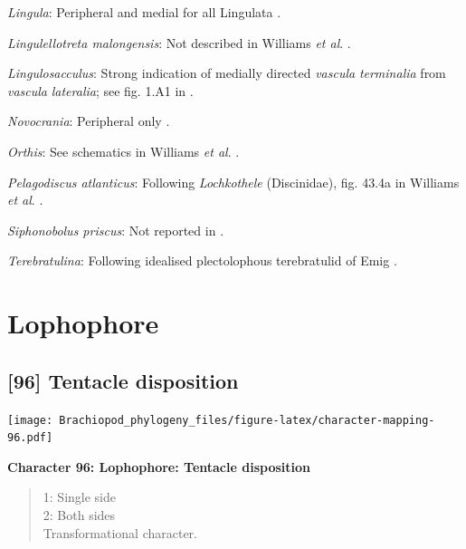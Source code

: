 \documentclass[openany]{book}
\theoremstyle{definition}
\theoremstyle{definition}
\theoremstyle{definition}
\theoremstyle{remark}
\begin{document}
\hypertarget{Lingula-coding-95}{}
\emph{Lingula}: Peripheral and medial for all Lingulata
\citep{Williams2000LinguliformeaCraniiformea}.

\hypertarget{Lingulellotreta_malongensis-coding-95}{}
\emph{Lingulellotreta malongensis}: Not described in Williams \emph{et
al}. \citeyearpar{Williams2000LinguliformeaCraniiformea}.

\hypertarget{Lingulosacculus-coding-95}{}
\emph{Lingulosacculus}: Strong indication of medially directed
\emph{vascula} \emph{terminalia} from \emph{vascula} \emph{lateralia};
see fig. 1.A1 in \citet{Balthasar2009EarlyCambrian}.

\hypertarget{Novocrania-coding-95}{}
\emph{Novocrania}: Peripheral only
\citep[p.158]{Williams2000LinguliformeaCraniiformea}.

\hypertarget{Orthis-coding-95}{}
\emph{Orthis}: See schematics in Williams \emph{et al}.
\citeyearpar{Williams2000LinguliformeaCraniiformea}.

\hypertarget{Pelagodiscus_atlanticus-coding-95}{}
\emph{Pelagodiscus atlanticus}: Following \emph{Lochkothele}
(Discinidae), fig. 43.4a in Williams \emph{et al}.
\citeyearpar{Williams2000LinguliformeaCraniiformea}.

\hypertarget{Siphonobolus_priscus-coding-95}{}
\emph{Siphonobolus priscus}: Not reported in
\citet{Williams2000LinguliformeaCraniiformea}.

\hypertarget{Terebratulina-coding-95}{}
\emph{Terebratulina}: Following idealised plectolophous terebratulid of
Emig \citeyearpar{Emig1992Functionaldisposition}.

\section{Lophophore}\label{lophophore}

\subsection*{{[}96{]} Tentacle disposition}\label{tentacle-disposition}

\texttt{[image: Brachiopod\_phylogeny\_files/figure-latex/character-mapping-96.pdf]}

\textbf{Character 96: Lophophore: Tentacle disposition}

\begin{quote}
1: Single side\\
2: Both sides\\
Transformational character.
\end{quote}
\end{document}
